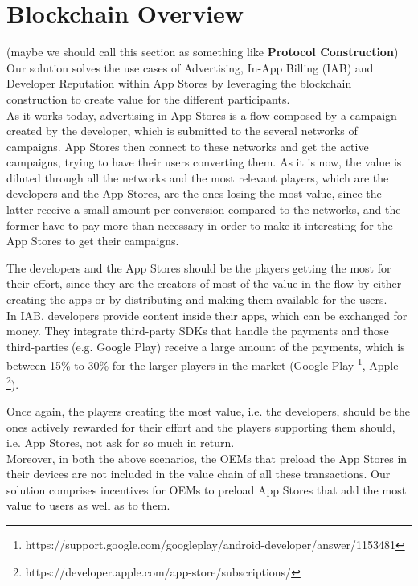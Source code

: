 \section{Blockchain Overview}
(maybe we should call this section as something like \textbf{Protocol Construction})\\

Our solution solves the use cases of Advertising, In-App Billing (IAB) and Developer Reputation within App Stores by leveraging the blockchain construction to create value for the different participants.\\

As it works today, advertising in App Stores is a flow composed by a campaign created by the developer, which is submitted to the several networks of campaigns. App Stores then connect to these networks and get the active campaigns, trying to have their users converting them. As it is now, the value is diluted through all the networks and the most relevant players, which are the developers and the App Stores, are the ones losing the most value, since the latter receive a small amount per conversion compared to the networks, and the former have to pay more than necessary in order to make it interesting for the App Stores to get their campaigns.

The developers and the App Stores should be the players getting the most for their effort, since they are the creators of most of the value in the flow by either creating the apps or by distributing and making them available for the users.\\

In IAB, developers provide content inside their apps, which can be exchanged for money. They integrate third-party SDKs that handle the payments and those third-parties (e.g. Google Play) receive a large amount of the payments, which is between 15\% to 30\% for the larger players in the market (Google Play \footnote{https://support.google.com/googleplay/android-developer/answer/1153481}, Apple \footnote{https://developer.apple.com/app-store/subscriptions/}).

Once again, the players creating the most value, i.e. the developers, should be the ones actively rewarded for their effort and the players supporting them should, i.e. App Stores, not ask for so much in return.\\

Moreover, in both the above scenarios, the OEMs that preload the App Stores in their devices are not included in the value chain of all these transactions. Our solution comprises incentives for OEMs to preload App Stores that add the most value to users as well as to them.\\

